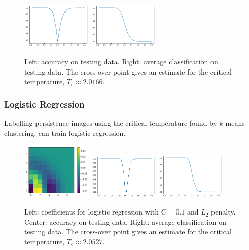 \documentclass[11pt]{article}
\begin{document}
\begin{figure}[h]
	\centering
	\includegraphics[width=0.3\textwidth]{squareice_images/kmeans_2d_squareice}
	\includegraphics[width=0.3\textwidth]{squareice_images/kmeans_avg_2d_squareice}
	\caption{Left: accuracy on testing data. Right: average classification on testing data. The cross-over point gives an estimate for the critical temperature, $T_\text{c}\approx 2.0166$.}
\end{figure}


\subsubsection{Logistic Regression}
Labelling persistence images using the critical temperature found by $k$-means clustering, can train logistic regression.

\begin{figure}[h]
    \centering
    \includegraphics[width=0.3\textwidth]{squareice_images/logreg_2d_squareice}
    \includegraphics[width=0.3\textwidth]{squareice_images/logreg_acc_2d_squareice}
    \includegraphics[width=0.3\textwidth]{squareice_images/logreg_avg_2d_squareice}
    \caption{Left: coefficients for logistic regression with $C=0.1$ and $L_2$ penalty. Center: accuracy on testing data. Right: average classification on testing data. The cross-over point gives an estimate for the critical temperature, $T_\text{c}\approx 2.0527$.}
    \label{fig:SquareiceLogReg}
\end{figure}
\end{document}
